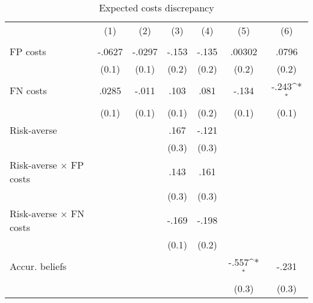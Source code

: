 \begin{table}[htbp]\centering
\def\sym#1{\ifmmode^{#1}\else\(^{#1}\)\fi}
\caption{Expected costs discrepancy}
\begin{tabular}{l*{6}{c}}
\hline\hline
                &\multicolumn{1}{c}{(1)}&\multicolumn{1}{c}{(2)}&\multicolumn{1}{c}{(3)}&\multicolumn{1}{c}{(4)}&\multicolumn{1}{c}{(5)}&\multicolumn{1}{c}{(6)}\\
                &\multicolumn{1}{c}{}&\multicolumn{1}{c}{}&\multicolumn{1}{c}{}&\multicolumn{1}{c}{}&\multicolumn{1}{c}{}&\multicolumn{1}{c}{}\\
\hline
FP costs        &   -.0627         &   -.0297         &    -.153         &    -.135         &   .00302         &    .0796         \\
                &    (0.1)         &    (0.1)         &    (0.2)         &    (0.2)         &    (0.2)         &    (0.2)         \\
FN costs        &    .0285         &    -.011         &     .103         &     .081         &    -.134         &    -.243\sym{*}  \\
                &    (0.1)         &    (0.1)         &    (0.1)         &    (0.2)         &    (0.1)         &    (0.1)         \\
Risk-averse     &                  &                  &     .167         &    -.121         &                  &                  \\
                &                  &                  &    (0.3)         &    (0.3)         &                  &                  \\
Risk-averse $\times$ FP costs&                  &                  &     .143         &     .161         &                  &                  \\
                &                  &                  &    (0.3)         &    (0.3)         &                  &                  \\
Risk-averse $\times$ FN costs&                  &                  &    -.169         &    -.198         &                  &                  \\
                &                  &                  &    (0.1)         &    (0.2)         &                  &                  \\
Accur. beliefs  &                  &                  &                  &                  &    -.557\sym{*}  &    -.231         \\
                &                  &                  &                  &                  &    (0.3)         &    (0.3)         \\

\end{tabular}
\end{table}
